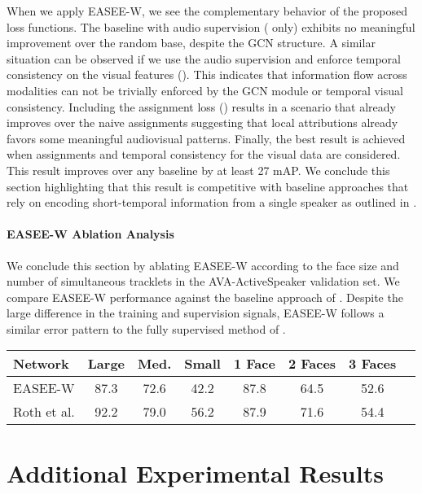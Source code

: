 \documentclass[10pt,twocolumn,letterpaper]{article}
\begin{document}
When we apply EASEE-W, we see the complementary behavior of the proposed loss functions. The baseline with audio supervision ( only) exhibits no meaningful improvement over the random base, despite the GCN structure.  A similar situation can be observed if we use the audio supervision and enforce temporal consistency on the visual features (). This indicates that information flow across modalities can not be trivially enforced by the GCN module or temporal visual consistency. Including the assignment loss () results in a scenario that already improves over the naive assignments suggesting that local attributions already favors some meaningful audiovisual patterns. Finally, the best result is achieved when assignments and temporal consistency for the visual data are considered. This result improves over any baseline by at least 27 mAP. We conclude this section highlighting that this result is competitive with baseline approaches that rely on encoding short-temporal information from a single speaker as outlined in \cite{roth2020ava,alcazar2020active}.

\paragraph{EASEE-W Ablation Analysis} We conclude this section by ablating EASEE-W according to the face size and number of simultaneous tracklets in the AVA-ActiveSpeaker validation set. We compare EASEE-W performance against the baseline approach of \cite{roth2020ava}. Despite the large difference in the training and supervision signals, EASEE-W follows a similar error pattern to the fully supervised method of \cite{roth2020ava}.


\begin{table}[h]
    \scriptsize
    \centering
    \begin{tabular}{l | c c c c c c c}
        \hline
        \textbf{Network} & \textbf{Large} & \textbf{Med.} & \textbf{Small} & \textbf{1 Face} & \textbf{2 Faces} & \textbf{3 Faces} \\
        \hline
        EASEE-W & 87.3& 72.6 & 42.2  & 87.8 & 64.5 &  52.6  \\
        Roth et al. \cite{roth2020ava} & 92.2 & 79.0 & 56.2 & 87.9 & 71.6 & 54.4 \\
    	\toprule
    \end{tabular}
\end{table}




 
\section{Additional Experimental Results}
\end{document}
